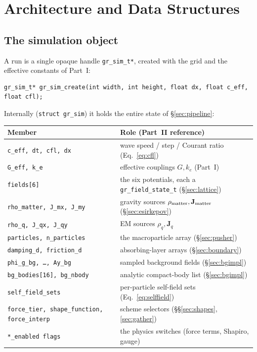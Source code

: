 \documentclass[11pt]{article}
\newcommand{\vv}[1]{\mathbf{#1}}           %
\newcommand{\keff}{k_e}
\begin{document}
\section{Architecture and Data Structures}
\label{sec:arch}

\subsection{The simulation object}

A run is a single opaque handle \texttt{gr\_sim\_t*}, created with the grid and
the effective constants of Part~I:
\begin{verbatim}
gr_sim_t* gr_sim_create(int width, int height, float dx, float c_eff, float cfl);
\end{verbatim}
Internally (\texttt{struct gr\_sim}) it holds the entire state of
\S\ref{sec:pipeline}:
\begin{center}
\begin{tabular}{@{}L{5.6cm}L{8.2cm}@{}}
\toprule
\textbf{Member} & \textbf{Role (Part~II reference)} \\
\midrule
\texttt{c\_eff, dt, cfl, dx} & wave speed / step / Courant ratio (Eq.~\eqref{eq:cfl}) \\
\texttt{G\_eff, k\_e}        & effective couplings $G,\keff$ (Part~I) \\
\texttt{fields[6]}           & the six potentials, each a \texttt{gr\_field\_state\_t} (\S\ref{sec:lattice}) \\
\texttt{rho\_matter, J\_mx, J\_my} & gravity sources $\rho_{\rm matter},\vv J_{\rm matter}$ (\S\ref{sec:esirkepov}) \\
\texttt{rho\_q, J\_qx, J\_qy}      & EM sources $\rho_q,\vv J_q$ \\
\texttt{particles, n\_particles}  & the macroparticle array (\S\ref{sec:pusher}) \\
\texttt{damping\_d, friction\_d}  & absorbing-layer arrays (\S\ref{sec:boundary}) \\
\texttt{phi\_g\_bg, \dots, Ay\_bg} & sampled background fields (\S\ref{sec:bgimpl}) \\
\texttt{bg\_bodies[16], bg\_nbody} & analytic compact-body list (\S\ref{sec:bgimpl}) \\
\texttt{self\_field\_sets}         & per-particle self-field sets (Eq.~\eqref{eq:selffield}) \\
\texttt{force\_tier, shape\_function, force\_interp} & scheme selectors (\S\S\ref{sec:shapes},\ref{sec:gather}) \\
\texttt{*\_enabled flags}          & the physics switches (force terms, Shapiro, gauge) \\
\bottomrule
\end{tabular}
\end{center}
\end{document}
